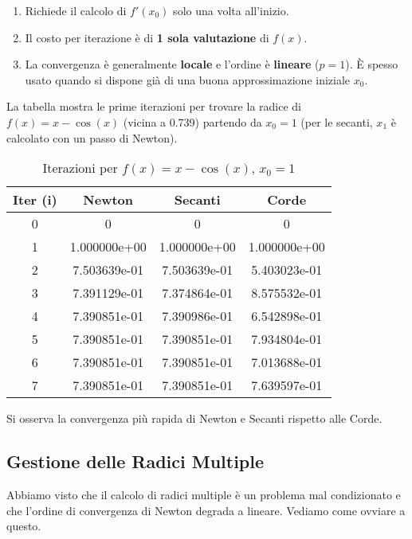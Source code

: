 \begin{osservazione}
\begin{enumerate}
    \item Richiede il calcolo di $f'(x_0)$ solo una volta all'inizio.
    \item Il costo per iterazione è di \textbf{1 sola valutazione} di $f(x)$.
    \item La convergenza è generalmente \textbf{locale} e l'ordine è \textbf{lineare} ($p=1$). È spesso usato quando si dispone già di una buona approssimazione iniziale $x_0$.
\end{enumerate}
\end{osservazione}

\begin{esempio}[Confronto Metodi per $f(x) = x - \cos(x)$]
La tabella mostra le prime iterazioni per trovare la radice di $f(x) = x - \cos(x)$ (vicina a 0.739) partendo da $x_0=1$ (per le secanti, $x_1$ è calcolato con un passo di Newton).

\begin{table}[H]
\centering
\caption{Iterazioni per $f(x)=x-\cos(x)$, $x_0=1$}
\begin{tabular}{cccc}
\toprule
Iter (i) & Newton & Secanti & Corde \\
\midrule
0 & 0 & 0 & 0 \\
1 & 1.000000e+00 & 1.000000e+00 & 1.000000e+00 \\
2 & 7.503639e-01 & 7.503639e-01 & 5.403023e-01 \\ %
3 & 7.391129e-01 & 7.374864e-01 & 8.575532e-01 \\ 
4 & 7.390851e-01 & 7.390986e-01 & 6.542898e-01 \\
5 & 7.390851e-01 & 7.390851e-01 & 7.934804e-01 \\
6 & 7.390851e-01 & 7.390851e-01 & 7.013688e-01 \\
7 & 7.390851e-01 & 7.390851e-01 & 7.639597e-01 \\
\bottomrule
\end{tabular}
\end{table}
Si osserva la convergenza più rapida di Newton e Secanti rispetto alle Corde.
\end{esempio}

\subsection{Gestione delle Radici Multiple}
Abbiamo visto che il calcolo di radici multiple è un problema mal condizionato e che l'ordine di convergenza di Newton degrada a lineare. Vediamo come ovviare a questo.

